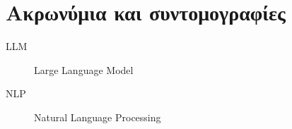 \chapter{Ακρωνύμια και συντομογραφίες}

\begin{description}
  \item[LLM] Large Language Model
  \item[NLP] Natural Language Processing
\end{description}
